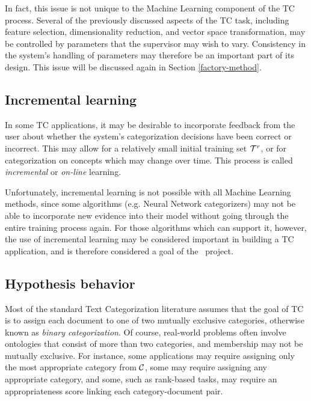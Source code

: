 In fact, this issue is not unique to the Machine Learning component of
the TC process.  Several of the previously discussed aspects of the TC
task, including feature selection, dimensionality reduction, and
vector space transformation, may be controlled by parameters that the
supervisor may wish to vary.  Consistency in the system's handling of
parameters may therefore be an important part of its design.  This
issue will be discussed again in Section \ref{factory-method}.

\subsection{Incremental learning}

In some TC applications, it may be desirable to incorporate feedback
from the user about whether the system's categorization decisions have
been correct or incorrect. \cite[p. 28]{sebastiani:02} This may allow
for a relatively small initial training set $\mathcal{T}^r$, or for
categorization on concepts which may change over time.  This process
is called \emph{incremental} or \emph{on-line} learning.

Unfortunately, incremental learning is not possible with all Machine
Learning methods, since some algorithms (e.g. Neural Network
categorizers) may not be able to incorporate new evidence into their
model without going through the entire training process again.  For
those algorithms which can support it, however, the use of incremental
learning may be considered important in building a TC application, and
is therefore considered a goal of the \aicat\ project.

\subsection{Hypothesis behavior}
\label{Hypothesis behavior}

Most of the standard Text Categorization literature assumes that the
goal of TC is to assign each document to one of two mutually exclusive
categories, otherwise known as \emph{binary
categorization}. \cite[p. 3]{sebastiani:02} Of course, real-world
problems often involve ontologies that consist of more than two
categories, and membership may not be mutually exclusive.  For
instance, some applications may require assigning only the most
appropriate category from $\mathcal{C}$, some may require assigning any
appropriate category, and some, such as rank-based tasks, may require
an appropriateness score linking each category-document pair.

